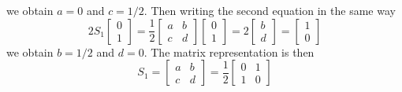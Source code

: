 \documentclass[../../../main.tex]{subfiles}
\begin{document}
we obtain $a=0$ and $c=1/2$.
Then writing the second equation in the same way
\begin{equation*}
    2S_1 \begin{bmatrix}
        0 \\
        1
    \end{bmatrix}  =
    \frac{1 }{2}
    \begin{bmatrix}
        a & b \\
        c & d
    \end{bmatrix}  \begin{bmatrix}
        0 \\
        1
    \end{bmatrix}  =
    2
    \begin{bmatrix}
        b \\
        d
    \end{bmatrix}
    =
    \begin{bmatrix}
        1 \\
        0
    \end{bmatrix}
\end{equation*}
we obtain $b=1/2$ and $d=0$.
The matrix representation is then
\begin{equation*}
    S_1 =
    \begin{bmatrix}
        a & b \\
        c & d
    \end{bmatrix}=
    \frac{1  }{2}
    \begin{bmatrix}
        0 & 1 \\
        1 & 0
    \end{bmatrix}
\end{equation*}
\end{document}
